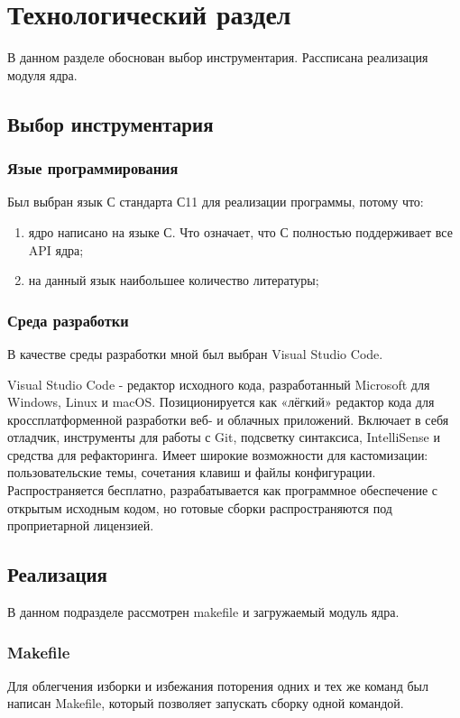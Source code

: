 \section{Технологический раздел}
В данном разделе обоснован выбор инструментария. Рассписана реализация модуля ядра.
\subsection{Выбор инструментария}
\subsubsection{Язые программирования}
Был выбран язык С стандарта С11 для реализации программы, потому что:
\begin{enumerate}
	\item ядро написано на языке С.
	Что означает, что С полностью поддерживает все API ядра;
	\item на данный язык наибольшее количество литературы;
\end{enumerate}

\subsubsection{Среда разработки}
В качестве среды разработки мной был выбран Visual Studio Code.

Visual Studio Code - редактор исходного кода, разработанный Microsoft для Windows, Linux и macOS. Позиционируется как «лёгкий» редактор кода для кроссплатформенной разработки веб- и облачных приложений. Включает в себя отладчик, инструменты для работы с Git, подсветку синтаксиса, IntelliSense и средства для рефакторинга. Имеет широкие возможности для кастомизации: пользовательские темы, сочетания клавиш и файлы конфигурации. Распространяется бесплатно, разрабатывается как программное обеспечение с открытым исходным кодом, но готовые сборки распространяются под проприетарной лицензией.

\subsection{Реализация}
В данном подразделе рассмотрен makefile и загружаемый модуль ядра.
\subsubsection{Makefile}
Для облегчения изборки и избежания поторения одних и тех же команд был написан Makefile, который позволяет запускать сборку одной командой.


